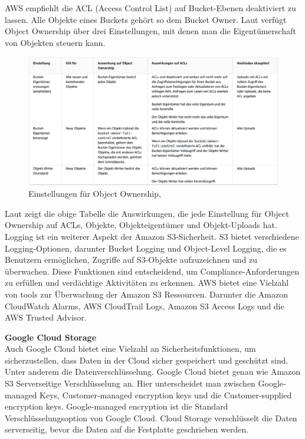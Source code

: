 \newpage

AWS empfiehlt die ACL (Access Control List) auf Bucket-Ebenen deaktiviert zu lassen. Alle Objekte eines Buckets gehört so dem Bucket Owner. Laut \citeauthor{aws-iam-s3} verfügt Object Ownership über drei Einstellungen, mit denen man die Eigentümerschaft von Objekten steuern kann.

\begin{figure}[h]
\centering
	\includegraphics[width=13cm,keepaspectratio]{Pictures/objectOwnershipTable.png}
	\caption{Einstellungen für Object Ownership, }
\end{figure}

Laut \citeauthor{aws-iam-s3} zeigt die obige Tabelle die Auswirkungen, die jede Einstellung für Object Ownership auf ACLs, Objekte, Objekteigentümer und Objekt-Uploads hat.\\

Logging ist ein weiterer Aspekt der Amazon S3-Sicherheit. S3 bietet verschiedene Logging-Optionen, darunter Bucket Logging und Object-Level Logging, die es Benutzern ermöglichen, Zugriffe auf S3-Objekte aufzuzeichnen und zu überwachen. Diese Funktionen sind entscheidend, um Compliance-Anforderungen zu erfüllen und verdächtige Aktivitäten zu erkennen. AWS bietet eine Vielzahl von tools zur Überwachung der Amazon S3 Ressourcen. Darunter die Amazon CloudWatch Alarms, AWS CloudTrail Logs, Amazon S3 Access Logs und die AWS Trusted Advisor.\\


\newpage

\textbf{Google Cloud Storage}\\

Auch Google Cloud bietet eine Vielzahl an Sicherheitsfunktionen, um sicherzustellen, dass Daten in der Cloud sicher gespeichert und geschützt sind. Unter anderem die Datenverschlüsselung. Google Cloud bietet genau wie Amazon S3 Serverseitige Verschlüsselung an. Hier unterscheidet man zwischen Google-managed Keys, Customer-managed encryption keys und die Customer-supplied encryption keys. Google-managed encryption ist die Standard Verschlüsselungsoption von Google Cloud. Cloud Storage verschlüsselt die Daten serverseitig, bevor die Daten auf die Festplatte geschrieben werden. 

